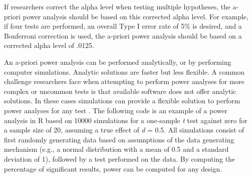 \documentclass[
  oneside]{book}
\newenvironment{Shaded}{\begin{snugshade}}{\end{snugshade}}
\newcommand{\AttributeTok}[1]{\textcolor[rgb]{0.77,0.63,0.00}{#1}}
\newcommand{\CommentTok}[1]{\textcolor[rgb]{0.56,0.35,0.01}{\textit{#1}}}
\newcommand{\ControlFlowTok}[1]{\textcolor[rgb]{0.13,0.29,0.53}{\textbf{#1}}}
\newcommand{\DecValTok}[1]{\textcolor[rgb]{0.00,0.00,0.81}{#1}}
\newcommand{\FloatTok}[1]{\textcolor[rgb]{0.00,0.00,0.81}{#1}}
\newcommand{\FunctionTok}[1]{\textcolor[rgb]{0.00,0.00,0.00}{#1}}
\newcommand{\NormalTok}[1]{#1}
\newcommand{\OtherTok}[1]{\textcolor[rgb]{0.56,0.35,0.01}{#1}}
\newcommand{\SpecialCharTok}[1]{\textcolor[rgb]{0.00,0.00,0.00}{#1}}
\begin{document}
If researchers correct the alpha level when testing multiple hypotheses, the a-priori power analysis should be based on this corrected alpha level. For example, if four tests are performed, an overall Type I error rate of 5\% is desired, and a Bonferroni correction is used, the a-priori power analysis should be based on a corrected alpha level of .0125.

An a-priori power analysis can be performed analytically, or by performing computer simulations. Analytic solutions are faster but less flexible. A common challenge researchers face when attempting to perform power analyses for more complex or uncommon tests is that available software does not offer analytic solutions. In these cases simulations can provide a flexible solution to perform power analyses for any test \citep{morris_using_2019}. The following code is an example of a power analysis in R based on 10000 simulations for a one-sample \emph{t} test against zero for a sample size of 20, assuming a true effect of \emph{d} = 0.5. All simulations consist of first randomly generating data based on assumptions of the data generating mechanism (e.g., a normal distribution with a mean of 0.5 and a standard deviation of 1), followed by a test performed on the data. By computing the percentage of significant results, power can be computed for any design.

\begin{Shaded}
\end{Shaded}
\end{document}
